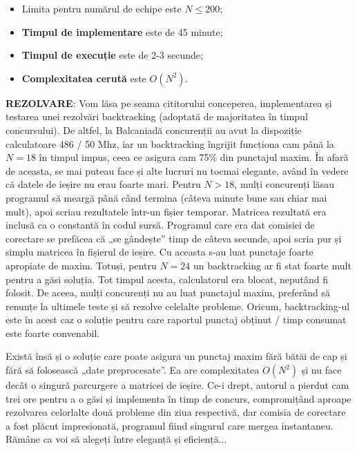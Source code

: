 \begin{itemize}

\item Limita pentru numărul de echipe este $N \leq 200$;

\item {\bf Timpul de implementare} este de 45 minute;

\item {\bf Timpul de execuție} este de 2-3 secunde;

\item {\bf Complexitatea cerută} este $O(N^2)$.

\end{itemize}

{\bf REZOLVARE}: Vom lăsa pe seama cititorului conceperea, implementarea și
testarea unei rezolvări backtracking (adoptată de majoritatea în timpul
concursului). De altfel, la Balcaniadă concurenții au avut la dispoziție
calculatoare 486 / 50 Mhz, iar un backtracking îngrijit funcționa cam până la
$N = 18$ în timpul impus, ceea ce asigura cam 75\% din punctajul maxim. În
afară de aceasta, se mai puteau face și alte lucruri nu tocmai elegante, având
în vedere că datele de ieșire nu erau foarte mari. Pentru $N > 18$, mulți
concurenți lăsau programul să meargă până când termina (câteva minute bune sau
chiar mai mult), apoi scriau rezultatele într-un fișier temporar. Matricea
rezultată era inclusă ca o constantă în codul sursă. Programul care era dat
comisiei de corectare se prefăcea că „se gândește” timp de câteva secunde,
apoi scria pur și simplu matricea în fișierul de ieșire. Cu aceasta s-au luat
punctaje foarte apropiate de maxim. Totuși, pentru $N = 24$ un backtracking ar
fi stat foarte mult pentru a găsi soluția. Tot timpul acesta, calculatorul era
blocat, neputând fi folosit. De aceea, mulți concurenți nu au luat punctajul
maxim, preferând să renunțe la ultimele teste și să rezolve celelalte
probleme. Oricum, backtracking-ul este în acest caz o soluție pentru care
raportul punctaj obținut / timp consumat este foarte convenabil.

Există însă și o soluție care poate asigura un punctaj maxim fără bătăi de cap
și fără să folosească „date preprocesate”. Ea are complexitatea $O(N^2)$ și nu
face decât o singură parcurgere a matricei de ieșire. Ce-i drept, autorul a
pierdut cam trei ore pentru a o găsi și implementa în timp de concurs,
compromițând aproape rezolvarea celorlalte două probleme din ziua respectivă,
dar comisia de corectare a fost plăcut impresionată, programul fiind singurul
care mergea instantaneu. Rămâne ca voi să alegeți între eleganță și
eficiență...

